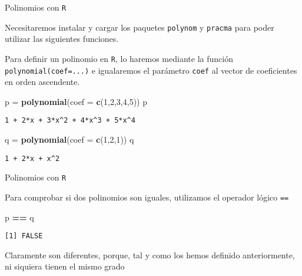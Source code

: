 \documentclass[
  ignorenonframetext,
]{beamer}
\newenvironment{Shaded}{\begin{snugshade}}{\end{snugshade}}
\newcommand{\DataTypeTok}[1]{\textcolor[rgb]{0.13,0.29,0.53}{#1}}
\newcommand{\DecValTok}[1]{\textcolor[rgb]{0.00,0.00,0.81}{#1}}
\newcommand{\KeywordTok}[1]{\textcolor[rgb]{0.13,0.29,0.53}{\textbf{#1}}}
\newcommand{\NormalTok}[1]{#1}
\newcommand{\OperatorTok}[1]{\textcolor[rgb]{0.81,0.36,0.00}{\textbf{#1}}}
\newcommand{\StringTok}[1]{\textcolor[rgb]{0.31,0.60,0.02}{#1}}
\begin{document}
\begin{frame}[fragile]{Polinomios con \texttt{R}}
\protect\hypertarget{polinomios-con-r-1}{}

Necesitaremos instalar y cargar los paquetes \texttt{polynom} y
\texttt{pracma} para poder utilizar las siguientes funciones.

Para definir un polinomio en \texttt{R}, lo haremos mediante la función
\texttt{polynomial(coef=...)} e igualaremos el parámetro \texttt{coef}
al vector de coeficientes en orden ascendente.

\begin{Shaded}
\begin{Highlighting}[]
\NormalTok{p =}\StringTok{ }\KeywordTok{polynomial}\NormalTok{(}\DataTypeTok{coef =} \KeywordTok{c}\NormalTok{(}\DecValTok{1}\NormalTok{,}\DecValTok{2}\NormalTok{,}\DecValTok{3}\NormalTok{,}\DecValTok{4}\NormalTok{,}\DecValTok{5}\NormalTok{))}
\NormalTok{p}
\end{Highlighting}
\end{Shaded}

\begin{verbatim}
1 + 2*x + 3*x^2 + 4*x^3 + 5*x^4 
\end{verbatim}

\begin{Shaded}
\begin{Highlighting}[]
\NormalTok{q =}\StringTok{ }\KeywordTok{polynomial}\NormalTok{(}\DataTypeTok{coef =} \KeywordTok{c}\NormalTok{(}\DecValTok{1}\NormalTok{,}\DecValTok{2}\NormalTok{,}\DecValTok{1}\NormalTok{))}
\NormalTok{q}
\end{Highlighting}
\end{Shaded}

\begin{verbatim}
1 + 2*x + x^2 
\end{verbatim}

\end{frame}

\begin{frame}[fragile]{Polinomios con \texttt{R}}
\protect\hypertarget{polinomios-con-r-2}{}

Para comprobar si dos polinomios son iguales, utilizamos el operador
lógico \texttt{==}

\begin{Shaded}
\begin{Highlighting}[]
\NormalTok{p }\OperatorTok{==}\StringTok{ }\NormalTok{q}
\end{Highlighting}
\end{Shaded}

\begin{verbatim}
[1] FALSE
\end{verbatim}

Claramente son diferentes, porque, tal y como los hemos definido
anteriormente, ni siquiera tienen el mismo grado

\end{frame}
\end{document}
